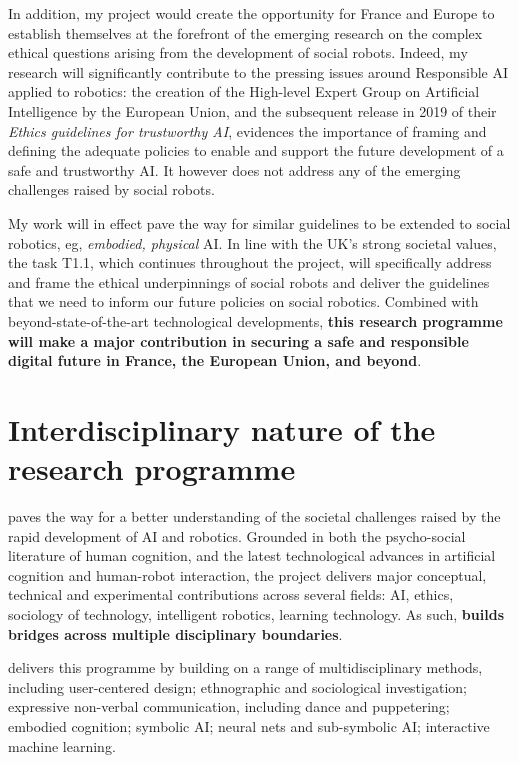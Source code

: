 In addition, my project would create the opportunity for France and Europe to establish
themselves at the forefront of the emerging research on the complex ethical
questions arising from the development of social robots. Indeed, my research
will significantly contribute to the pressing issues around Responsible AI
applied to robotics: the creation of the High-level Expert Group on Artificial
Intelligence by the European Union, and the subsequent release in 2019 of their
\emph{Ethics guidelines for trustworthy AI}, evidences the importance of framing
and defining the adequate policies to enable and support the future development
of a safe and trustworthy AI. It however does not address any of the emerging
challenges raised by social robots.

My work will in effect pave the way for similar guidelines to be extended to
social robotics, eg, \emph{embodied, physical} AI. In line with the UK's strong
societal values, the task T1.1, which continues throughout the project, will
specifically address and frame the ethical underpinnings of social robots
and deliver the guidelines that we need to inform our future policies on social
robotics. Combined with beyond-state-of-the-art technological developments,
\textbf{this research programme will make a major contribution in
securing a safe and responsible digital future in France, the European Union, and beyond}. 


\section{Interdisciplinary nature of the research programme}

\project paves the way for a better understanding of the societal challenges
raised by the rapid development of AI and robotics. Grounded in both the
psycho-social literature of human cognition, and the latest technological
advances in artificial cognition and human-robot interaction, the project
delivers major conceptual, technical and experimental contributions across
several fields: AI, ethics, sociology of technology, intelligent robotics,
learning technology. As such, \textbf{\project builds bridges across
multiple disciplinary boundaries}.

\project delivers this programme by building on a range of multidisciplinary
methods, including user-centered design; ethnographic and sociological
investigation; expressive non-verbal communication, including dance and
puppetering; embodied cognition; symbolic AI; neural
nets and sub-symbolic AI; interactive machine learning.

